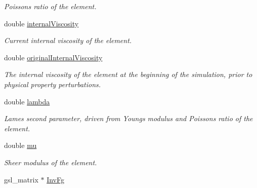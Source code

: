 \begin{DoxyCompactItemize}
\begin{DoxyCompactList}\small\item\em Poisson\textquotesingle{}s ratio of the element. \end{DoxyCompactList}\item 
\hypertarget{classShapeBase_a7fd0830ee5d4e64bb68e58aa77736757}{}double \hyperlink{classShapeBase_a7fd0830ee5d4e64bb68e58aa77736757}{internal\+Viscosity}\label{classShapeBase_a7fd0830ee5d4e64bb68e58aa77736757}

\begin{DoxyCompactList}\small\item\em Current internal viscosity of the element. \end{DoxyCompactList}\item 
\hypertarget{classShapeBase_a5abc42a65cd840e1c65a1a026aa3bb65}{}double \hyperlink{classShapeBase_a5abc42a65cd840e1c65a1a026aa3bb65}{original\+Internal\+Viscosity}\label{classShapeBase_a5abc42a65cd840e1c65a1a026aa3bb65}

\begin{DoxyCompactList}\small\item\em The internal viscosity of the element at the beginning of the simulation, prior to physical property perturbations. \end{DoxyCompactList}\item 
\hypertarget{classShapeBase_aa16b41d5791fc15531cbee067c502a5d}{}double \hyperlink{classShapeBase_aa16b41d5791fc15531cbee067c502a5d}{lambda}\label{classShapeBase_aa16b41d5791fc15531cbee067c502a5d}

\begin{DoxyCompactList}\small\item\em Lame\textquotesingle{}s second parameter, driven from Young\textquotesingle{}s modulus and Poisson\textquotesingle{}s ratio of the element. \end{DoxyCompactList}\item 
\hypertarget{classShapeBase_ac5819d0d117e5510611259177c477af8}{}double \hyperlink{classShapeBase_ac5819d0d117e5510611259177c477af8}{mu}\label{classShapeBase_ac5819d0d117e5510611259177c477af8}

\begin{DoxyCompactList}\small\item\em Sheer modulus of the element. \end{DoxyCompactList}\item 
\hypertarget{classShapeBase_afe7cb600a9316597a16512ab7b6fcd6f}{}gsl\+\_\+matrix $\ast$ \hyperlink{classShapeBase_afe7cb600a9316597a16512ab7b6fcd6f}{Inv\+Fg}\label{classShapeBase_afe7cb600a9316597a16512ab7b6fcd6f}


\end{DoxyCompactItemize}
